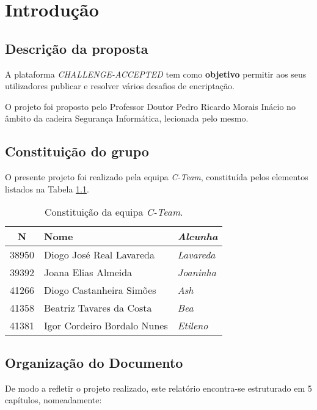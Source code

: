 \chapter{Introdução}
\label{chap:intro}

\section{Descrição da proposta}
\label{sec::intro:descricao}
A plataforma \textit{CHALLENGE-ACCEPTED} tem como \textbf{objetivo} permitir aos seus utilizadores publicar e resolver vários desafios de encriptação.

O projeto foi proposto pelo Professor Doutor Pedro Ricardo Morais Inácio no âmbito da cadeira Segurança Informática, lecionada pelo mesmo.


\section{Constituição do grupo}
\label{sec::intro:grupo}

O presente projeto foi realizado pela equipa \textit{C-Team}, constituída pelos elementos listados na Tabela \ref{tab::c-team}.

\begin{table}[!h]
	\centering
	\begin{tabular}{c l >{\itshape}l}
		\toprule
		\textbf{N\textordmasculine} & \textbf{Nome} & \normalfont\textbf{Alcunha} \\
		\midrule
		38950 & Diogo José Real Lavareda    & Lavareda \\
		39392 & Joana Elias Almeida         & Joaninha \\
		41266 & Diogo Castanheira Simões    & Ash      \\
		41358 & Beatriz Tavares da Costa    & Bea      \\
		41381 & Igor Cordeiro Bordalo Nunes & Etileno  \\
		\bottomrule
	\end{tabular}
	\caption[Constituição da equipa \textit{C-Team}]{Constituição da equipa \textit{C-Team}.}
	\label{tab::c-team}
\end{table}



\section{Organização do Documento}
\label{sec::intro:organizacao}
De modo a refletir o projeto realizado, este relatório encontra-se estruturado em 5 capítulos, nomeadamente:

